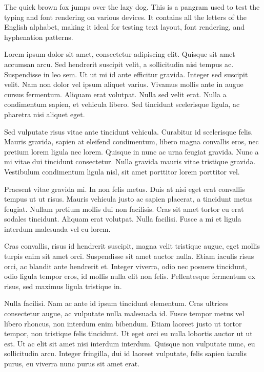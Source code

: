 The quick brown fox jumps over the lazy dog. This is a pangram used to test the typing and font rendering on various devices. It contains all the letters of the English alphabet, making it ideal for testing text layout, font rendering, and hyphenation patterns.

Lorem ipsum dolor sit amet, consectetur adipiscing elit. Quisque sit amet accumsan arcu. Sed hendrerit suscipit velit, a sollicitudin nisi tempus ac. Suspendisse in leo sem. Ut ut mi id ante efficitur gravida. Integer sed suscipit velit. Nam non dolor vel ipsum aliquet varius. Vivamus mollis ante in augue cursus fermentum. Aliquam erat volutpat. Nulla sed velit erat. Nulla a condimentum sapien, et vehicula libero. Sed tincidunt scelerisque ligula, ac pharetra nisi aliquet eget.

Sed vulputate risus vitae ante tincidunt vehicula. Curabitur id scelerisque felis. Mauris gravida, sapien at eleifend condimentum, libero magna convallis eros, nec pretium lorem ligula nec lorem. Quisque in nunc ac urna feugiat gravida. Nunc a mi vitae dui tincidunt consectetur. Nulla gravida mauris vitae tristique gravida. Vestibulum condimentum ligula nisl, sit amet porttitor lorem porttitor vel.

Praesent vitae gravida mi. In non felis metus. Duis at nisi eget erat convallis tempus ut ut risus. Mauris vehicula justo ac sapien placerat, a tincidunt metus feugiat. Nullam pretium mollis dui non facilisis. Cras sit amet tortor eu erat sodales tincidunt. Aliquam erat volutpat. Nulla facilisi. Fusce a mi et ligula interdum malesuada vel eu lorem.

Cras convallis, risus id hendrerit suscipit, magna velit tristique augue, eget mollis turpis enim sit amet orci. Suspendisse sit amet auctor nulla. Etiam iaculis risus orci, ac blandit ante hendrerit et. Integer viverra, odio nec posuere tincidunt, odio ligula tempor eros, id mollis nulla elit non felis. Pellentesque fermentum ex risus, sed maximus ligula tristique in.

Nulla facilisi. Nam ac ante id ipsum tincidunt elementum. Cras ultrices consectetur augue, ac vulputate nulla malesuada id. Fusce tempor metus vel libero rhoncus, non interdum enim bibendum. Etiam laoreet justo ut tortor tempor, non tristique felis tincidunt. Ut eget orci eu nulla lobortis auctor ut ut est. Ut ac elit sit amet nisi interdum interdum. Quisque non vulputate nunc, eu sollicitudin arcu. Integer fringilla, dui id laoreet vulputate, felis sapien iaculis purus, eu viverra nunc purus sit amet erat.

